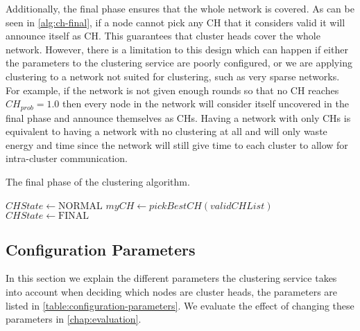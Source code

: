 Additionally, the final phase ensures that the whole network is covered. As can be seen in \cref{alg:ch-final}, if a node cannot pick any CH that it considers valid it will announce itself as CH. This guarantees that cluster heads cover the whole network. However, there is a limitation to this design which can happen if either the parameters to the clustering service are poorly configured, or we are applying clustering to a network not suited for clustering, such as very sparse networks. For example, if the network is not given enough rounds so that no CH reaches $CH_{prob} = 1.0$ then every node in the network will consider itself uncovered in the final phase and announce themselves as CHs. Having a network with only CHs is equivalent to having a network with no clustering at all and will only waste energy and time since the network will still give time to each cluster to allow for intra-cluster communication.


\iffalse
Since the number of rounds the clustering service is running is configurable, a battery percentage threshold can be calculated to only let nodes above the threshold reach probability $1.0$ before the final phase.

The lower bound on energy is a percentage of the total energy for a node and depends on the number of rounds the cluster service is running as well as the parameter $p_{min}$.

These values should be configured to fit the desired network; we do not evaluate the effect of different values of these parameters.
\fi

\begin{algorithm}[bt]
\caption{The final phase of the clustering algorithm.}
\label{alg:ch-final}
\begin{algorithmic}[1]
            \State $CHState \gets \text{NORMAL}$
            \State $myCH \gets pickBestCH(validCHList)$
        \Else
            \State $CHState \gets \text{FINAL}$
        \EndIf
    \EndIf
\EndProcedure
\end{algorithmic}
\end{algorithm}

\subsection{Configuration Parameters}
\label{design:configuration-parameters}
In this section we explain the different parameters the clustering service takes into account when deciding which nodes are cluster heads, the parameters are listed in \cref{table:configuration-parameters}. We evaluate the effect of changing these parameters in \cref{chap:evaluation}.

